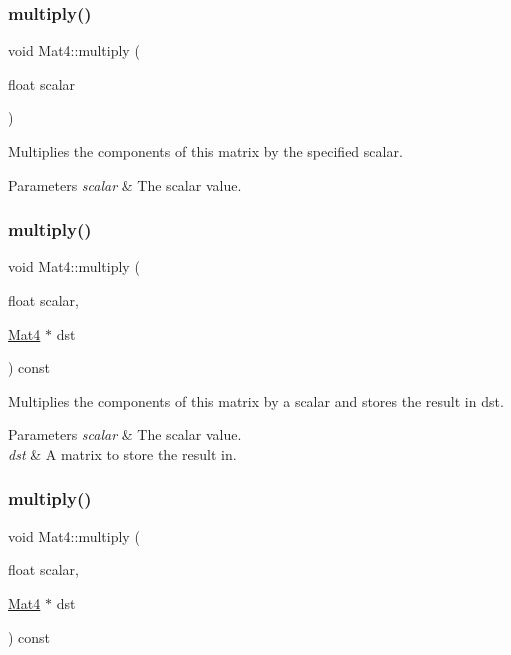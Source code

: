\subsubsection{\texorpdfstring{multiply()}{multiply()}\hspace{0.1cm}{\footnotesize\ttfamily [2/10]}}
{\footnotesize\ttfamily void Mat4\+::multiply (\begin{DoxyParamCaption}\item[{float}]{scalar }\end{DoxyParamCaption})}

Multiplies the components of this matrix by the specified scalar.


\begin{DoxyParams}{Parameters}
{\em scalar} & The scalar value. \\
\hline
\end{DoxyParams}
\mbox{\label{classMat4_a24498dcc626d53062cb021046fa19a52}} 
\subsubsection{\texorpdfstring{multiply()}{multiply()}\hspace{0.1cm}{\footnotesize\ttfamily [3/10]}}
{\footnotesize\ttfamily void Mat4\+::multiply (\begin{DoxyParamCaption}\item[{float}]{scalar,  }\item[{\hyperlink{classMat4}{Mat4} $\ast$}]{dst }\end{DoxyParamCaption}) const}

Multiplies the components of this matrix by a scalar and stores the result in dst.


\begin{DoxyParams}{Parameters}
{\em scalar} & The scalar value. \\
\hline
{\em dst} & A matrix to store the result in. \\
\hline
\end{DoxyParams}
\mbox{\label{classMat4_a24498dcc626d53062cb021046fa19a52}} 
\subsubsection{\texorpdfstring{multiply()}{multiply()}\hspace{0.1cm}{\footnotesize\ttfamily [4/10]}}
{\footnotesize\ttfamily void Mat4\+::multiply (\begin{DoxyParamCaption}\item[{float}]{scalar,  }\item[{\hyperlink{classMat4}{Mat4} $\ast$}]{dst }\end{DoxyParamCaption}) const}

